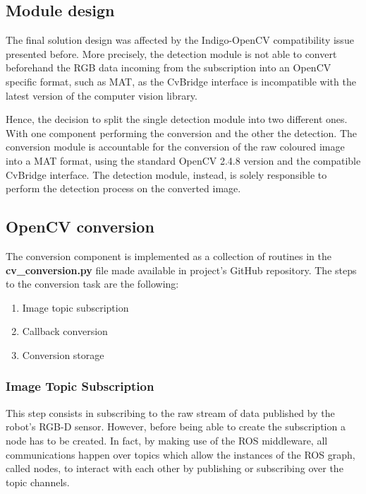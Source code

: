 \subsection{Module design}

The final solution design was affected by the Indigo-OpenCV compatibility issue presented before. More precisely, the detection module is not able to convert beforehand the RGB data incoming from the subscription into an OpenCV specific format, such as MAT, as the CvBridge interface is incompatible with the latest version of the computer vision library.

Hence, the decision to split the single detection module into two different ones. With one component performing the conversion and the other the detection. The conversion module is accountable for the conversion of the raw coloured image into a MAT format, using the standard OpenCV 2.4.8 version and the compatible CvBridge interface. The detection module, instead, is solely responsible to perform the detection process on the converted image.

\subsection{OpenCV conversion}

The conversion component is implemented as a collection of routines in the \textbf{cv\_conversion.py} file made available in project's GitHub repository. The steps to the conversion task are the following:

\begin{enumerate}
  \item Image topic subscription
  \item Callback conversion
  \item Conversion storage
\end{enumerate}

\subsubsection{Image Topic Subscription}

This step consists in subscribing to the raw stream of data published by the robot's RGB-D sensor. However, before being able to create the subscription a node has to be created. In fact, by making use of the ROS middleware, all communications happen over topics which allow the instances of the ROS graph, called nodes, to interact with each other by publishing or subscribing over the topic channels. 

